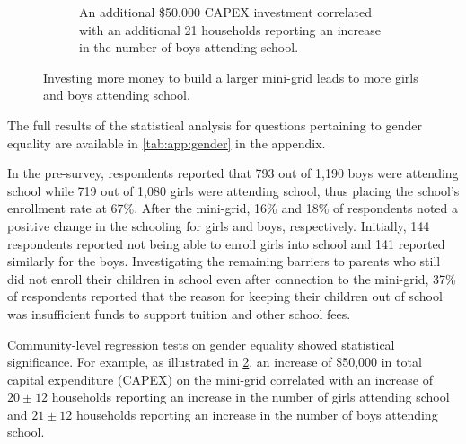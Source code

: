 \begin{figure}[b]
\begin{subfigure}[t]{0.48\textwidth}
        \caption{An additional \$50,000 CAPEX investment correlated with an additional 21 households reporting an increase in the number of boys attending school.}
        \label{fig:boys-school}
    \end{subfigure}
    \caption{Investing more money to build a larger mini-grid leads to more girls and boys attending school.}
    \label{fig:regression-schooling}
\end{figure}
The full results of the statistical analysis for questions pertaining to gender equality are available in \cref{tab:app:gender} in the appendix.

In the pre-survey, respondents reported that 793 out of 1,190 boys were attending school while 719 out of 1,080 girls were attending school, thus placing the school's enrollment rate at 67\%. After the mini-grid, 16\% and 18\% of respondents noted a positive change in the schooling for girls and boys, respectively. Initially, 144 respondents reported not being able to enroll girls into school and 141 reported similarly for the boys. Investigating the remaining barriers to parents who still did not enroll their children in school even after connection to the mini-grid, 37\% of respondents reported that the reason for keeping their children out of school was insufficient funds to support tuition and other school fees. 

Community-level regression tests on gender equality showed statistical significance. For example, as illustrated in \cref{fig:regression-schooling}, an increase of \$50,000 in total capital expenditure (CAPEX) on the mini-grid correlated with an increase of $20\pm12$ households reporting an increase in the number of girls attending school and $21\pm12$ households reporting an increase in the number of boys attending school.

